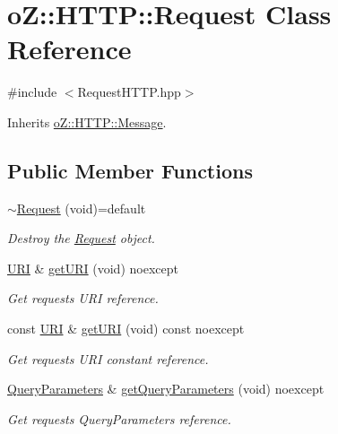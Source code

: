 \hypertarget{classo_z_1_1_h_t_t_p_1_1_request}{}\section{oZ\+::H\+T\+TP\+::Request Class Reference}
\label{classo_z_1_1_h_t_t_p_1_1_request}


{\ttfamily \#include $<$Request\+H\+T\+T\+P.\+hpp$>$}



Inherits \mbox{\hyperlink{classo_z_1_1_h_t_t_p_1_1_message}{o\+Z\+::\+H\+T\+T\+P\+::\+Message}}.

\subsection*{Public Member Functions}
\begin{DoxyCompactItemize}
\item 
\mbox{\hyperlink{classo_z_1_1_h_t_t_p_1_1_request_a2bc2913d79ffe8ce63a19c480b9cf330}{$\sim$\+Request}} (void)=default
\begin{DoxyCompactList}\small\item\em Destroy the \mbox{\hyperlink{classo_z_1_1_h_t_t_p_1_1_request}{Request}} object. \end{DoxyCompactList}\item 
\mbox{\hyperlink{namespaceo_z_1_1_h_t_t_p_a6d47156e2eac27750983fc1b54bd2ff8}{U\+RI}} \& \mbox{\hyperlink{classo_z_1_1_h_t_t_p_1_1_request_aaec3f19cb4ee6a18878166049df3253a}{get\+U\+RI}} (void) noexcept
\begin{DoxyCompactList}\small\item\em Get request\textquotesingle{}s U\+RI reference. \end{DoxyCompactList}\item 
const \mbox{\hyperlink{namespaceo_z_1_1_h_t_t_p_a6d47156e2eac27750983fc1b54bd2ff8}{U\+RI}} \& \mbox{\hyperlink{classo_z_1_1_h_t_t_p_1_1_request_afe1db07c464e1b708187108cbef952fa}{get\+U\+RI}} (void) const noexcept
\begin{DoxyCompactList}\small\item\em Get request\textquotesingle{}s U\+RI constant reference. \end{DoxyCompactList}\item 
\mbox{\hyperlink{namespaceo_z_1_1_h_t_t_p_adf31e2c29997ec6637f36d62ab8944d6}{Query\+Parameters}} \& \mbox{\hyperlink{classo_z_1_1_h_t_t_p_1_1_request_a6e710bce73719a47c0c8f59389a9b152}{get\+Query\+Parameters}} (void) noexcept
\begin{DoxyCompactList}\small\item\em Get request\textquotesingle{}s Query\+Parameters reference. \end{DoxyCompactList}\item 

\end{DoxyCompactItemize}

